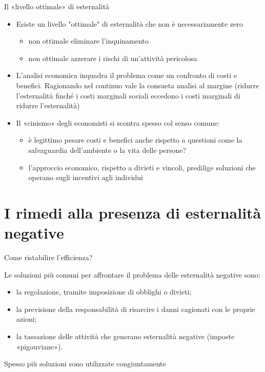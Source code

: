 \documentclass[aspectratio=64,11pt]{beamer}
\begin{document}
\begin{frame}{Il «livello ottimale» di esternalità}
\begin{itemize}
\item Esiste un livello "ottimale" di esternalità che non è necessariamente zero
\begin{itemize}
\item non ottimale eliminare l'inquinamento
\item non ottimale azzerare i rischi di un'attività pericolosa
\end{itemize}
\item L’analisi economica inquadra il problema come un confronto di costi e
benefici. Ragionando nel continuo vale la consueta analisi al margine
(ridurre l'esternalità finché i costi marginali sociali eccedono i costi
marginali di ridurre l'esternalità)
\item Il «cinismo» degli economisti si scontra spesso col senso comune:
\begin{itemize}
\item è legittimo pesare costi e benefici anche rispetto a questioni come la
salvaguardia dell'ambiente o la vita delle persone?
\item l’approccio economico, rispetto a divieti e vincoli, predilige soluzioni
che operano sugli incentivi agli individui
\end{itemize}
\end{itemize}
\end{frame}

\section{I rimedi alla presenza di esternalità negative}


\begin{frame}{Come ristabilire l'efficienza?}
\fontsize{13}{16}\selectfont

Le soluzioni più comuni per affrontare il problema delle esternalità negative sono:
\begin{itemize}
\item la \alert{regolazione}, tramite imposizione di obblighi o divieti;
\item la previsione della \alert{responsabilità} di risarcire i danni cagionati con le proprie azioni;
\item la \alert{tassazione} delle attività che generano esternalità negative (imposte «pigouviane»).
\end{itemize}

Spesso più soluzioni sono utilizzate congiuntamente
\end{frame}
\end{document}
